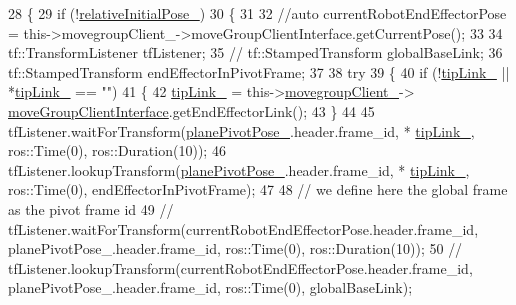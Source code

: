 \begin{DoxyCode}
28     \{
29         \textcolor{keywordflow}{if} (!\hyperlink{classcl__move__group__interface_1_1CbCircularPivotMotion_a1b2cc65d2f27a4dec54c20f1f00d4bb8}{relativeInitialPose\_})
30         \{
31 
32             \textcolor{comment}{//auto currentRobotEndEffectorPose =
       this->movegroupClient\_->moveGroupClientInterface.getCurrentPose();}
33 
34             tf::TransformListener tfListener;
35             \textcolor{comment}{// tf::StampedTransform globalBaseLink;}
36             tf::StampedTransform endEffectorInPivotFrame;
37 
38             \textcolor{keywordflow}{try}
39             \{
40                 \textcolor{keywordflow}{if} (!\hyperlink{classcl__move__group__interface_1_1CbMoveEndEffectorTrajectory_a24c6c30b9b0761a61fa002d947bd3e11}{tipLink\_} || *\hyperlink{classcl__move__group__interface_1_1CbMoveEndEffectorTrajectory_a24c6c30b9b0761a61fa002d947bd3e11}{tipLink\_} == \textcolor{stringliteral}{""})
41                 \{
42                     \hyperlink{classcl__move__group__interface_1_1CbMoveEndEffectorTrajectory_a24c6c30b9b0761a61fa002d947bd3e11}{tipLink\_} = this->\hyperlink{classcl__move__group__interface_1_1CbMoveEndEffectorTrajectory_aea650d3e7836125b32be97392b71a7f3}{movegroupClient\_}->
      \hyperlink{classcl__move__group__interface_1_1ClMoveGroup_a92922ea689e4e1b7b91512c56629c95b}{moveGroupClientInterface}.getEndEffectorLink();
43                 \}
44 
45                 tfListener.waitForTransform(\hyperlink{classcl__move__group__interface_1_1CbCircularPivotMotion_a0994efbe93b9f9a61fcf3703c360cda2}{planePivotPose\_}.header.frame\_id, *
      \hyperlink{classcl__move__group__interface_1_1CbMoveEndEffectorTrajectory_a24c6c30b9b0761a61fa002d947bd3e11}{tipLink\_}, ros::Time(0), ros::Duration(10));
46                 tfListener.lookupTransform(\hyperlink{classcl__move__group__interface_1_1CbCircularPivotMotion_a0994efbe93b9f9a61fcf3703c360cda2}{planePivotPose\_}.header.frame\_id, *
      \hyperlink{classcl__move__group__interface_1_1CbMoveEndEffectorTrajectory_a24c6c30b9b0761a61fa002d947bd3e11}{tipLink\_}, ros::Time(0), endEffectorInPivotFrame);
47 
48                 \textcolor{comment}{// we define here the global frame as the pivot frame id}
49                 \textcolor{comment}{// tfListener.waitForTransform(currentRobotEndEffectorPose.header.frame\_id,
       planePivotPose\_.header.frame\_id, ros::Time(0), ros::Duration(10));}
50                 \textcolor{comment}{// tfListener.lookupTransform(currentRobotEndEffectorPose.header.frame\_id,
       planePivotPose\_.header.frame\_id, ros::Time(0), globalBaseLink);}

\end{DoxyCode}
